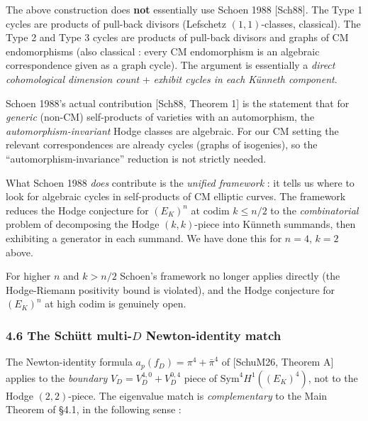 \documentclass[
  11pt,
  a4paper,
]{amsart}
\begin{document}
The above construction does \textbf{not} essentially use Schoen 1988 {[}Sch88{]}. The Type 1 cycles are products of pull-back divisors (Lefschetz \((1, 1)\)-classes, classical). The Type 2 and Type 3 cycles are products of pull-back divisors and graphs of CM endomorphisms (also classical : every CM endomorphism is an algebraic correspondence given as a graph cycle). The argument is essentially a \emph{direct cohomological dimension count} + \emph{exhibit cycles in each Künneth component}.

Schoen 1988's actual contribution {[}Sch88, Theorem 1{]} is the statement that for \emph{generic} (non-CM) self-products of varieties with an automorphism, the \emph{automorphism-invariant} Hodge classes are algebraic. For our CM setting the relevant correspondences are already cycles (graphs of isogenies), so the ``automorphism-invariance'' reduction is not strictly needed.

What Schoen 1988 \emph{does} contribute is the \emph{unified framework} : it tells us where to look for algebraic cycles in self-products of CM elliptic curves. The framework reduces the Hodge conjecture for \((E_K)^n\) at codim \(k \leq n/2\) to the \emph{combinatorial} problem of decomposing the Hodge \((k, k)\)-piece into Künneth summands, then exhibiting a generator in each summand. We have done this for \(n = 4\), \(k = 2\) above.

For higher \(n\) and \(k > n/2\) Schoen's framework no longer applies directly (the Hodge-Riemann positivity bound is violated), and the Hodge conjecture for \((E_K)^n\) at high codim is genuinely open.

\hypertarget{the-schuxfctt-multi-d-newton-identity-match}{%
\subsubsection{\texorpdfstring{4.6 The Schütt multi-\(D\) Newton-identity match}{4.6 The Schütt multi-D Newton-identity match}}\label{the-schuxfctt-multi-d-newton-identity-match}}

The Newton-identity formula \(a_p(f_D) = \pi^4 + \bar\pi^4\) of {[}SchuM26, Theorem A{]} applies to the \emph{boundary} \(V_D = V_D^{4,0} + V_D^{0,4}\) piece of \(\mathrm{Sym}^4 H^1((E_K)^4)\), not to the Hodge \((2,2)\)-piece. The eigenvalue match is \emph{complementary} to the Main Theorem of §4.1, in the following sense :
\end{document}
